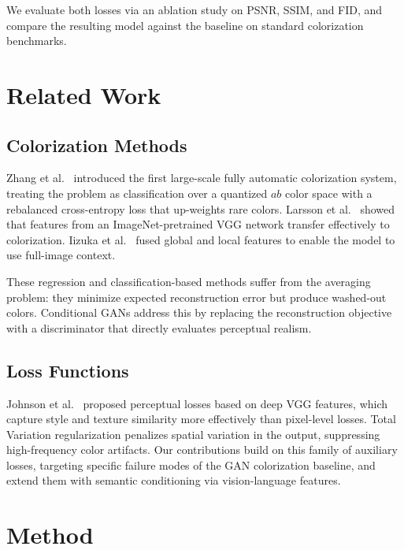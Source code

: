 \documentclass[conference]{IEEEtran}
\begin{document}
We evaluate both losses via an ablation study on PSNR, SSIM, and FID, and compare
the resulting model against the baseline on standard colorization benchmarks.


\section{Related Work}

\subsection{Colorization Methods}

Zhang et al.\ \cite{zhang2016colorful} introduced the first large-scale fully
automatic colorization system, treating the problem as classification over a
quantized $ab$ color space with a rebalanced cross-entropy loss that up-weights
rare colors. Larsson et al.\ \cite{larsson2016learning} showed that features
from an ImageNet-pretrained VGG network transfer effectively to colorization.
Iizuka et al.\ \cite{iizuka2016let} fused global and local features to enable
the model to use full-image context.

These regression and classification-based methods suffer from the averaging
problem: they minimize expected reconstruction error but produce washed-out
colors. Conditional GANs \cite{isola2017image} address this by replacing the
reconstruction objective with a discriminator that directly evaluates perceptual
realism.

\subsection{Loss Functions}

Johnson et al.\ \cite{johnson2016perceptual} proposed perceptual losses based on
deep VGG features, which capture style and texture similarity more effectively
than pixel-level losses. Total Variation regularization \cite{johnson2016perceptual}
penalizes spatial variation in the output, suppressing high-frequency color
artifacts. Our contributions build on this family of auxiliary losses, targeting
specific failure modes of the GAN colorization baseline, and extend them with
semantic conditioning via vision-language features.


\section{Method}
\end{document}
